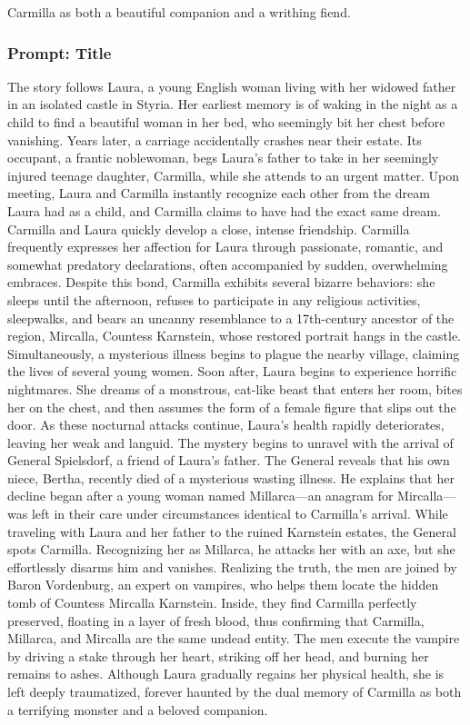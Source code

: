 \documentclass{article} %
\begin{document}
Carmilla as both a beautiful companion and a writhing fiend.

\subsubsection{Prompt: Title}

The story follows Laura, a young English woman living with her widowed father in an isolated castle in Styria. Her earliest memory is of waking in the night as a child to find a beautiful woman in her bed, who seemingly bit her chest before vanishing. Years later, a carriage accidentally crashes near their estate. Its occupant, a frantic noblewoman, begs Laura’s father to take in her seemingly injured teenage daughter, Carmilla, while she attends to an urgent matter. Upon meeting, Laura and Carmilla instantly recognize each other from the dream Laura had as a child, and Carmilla claims to have had the exact same dream. Carmilla and Laura quickly develop a close, intense friendship. Carmilla frequently expresses her affection for Laura through passionate, romantic, and somewhat predatory declarations, often accompanied by sudden, overwhelming embraces. Despite this bond, Carmilla exhibits several bizarre behaviors: she sleeps until the afternoon, refuses to participate in any religious activities, sleepwalks, and bears an uncanny resemblance to a 17th-century ancestor of the region, Mircalla, Countess Karnstein, whose restored portrait hangs in the castle. Simultaneously, a mysterious illness begins to plague the nearby village, claiming the lives of several young women. Soon after, Laura begins to experience horrific nightmares. She dreams of a monstrous, cat-like beast that enters her room, bites her on the chest, and then assumes the form of a female figure that slips out the door. As these nocturnal attacks continue, Laura’s health rapidly deteriorates, leaving her weak and languid. The mystery begins to unravel with the arrival of General Spielsdorf, a friend of Laura's father. The General reveals that his own niece, Bertha, recently died of a mysterious wasting illness. He explains that her decline began after a young woman named Millarca—an anagram for Mircalla—was left in their care under circumstances identical to Carmilla's arrival. While traveling with Laura and her father to the ruined Karnstein estates, the General spots Carmilla. Recognizing her as Millarca, he attacks her with an axe, but she effortlessly disarms him and vanishes. Realizing the truth, the men are joined by Baron Vordenburg, an expert on vampires, who helps them locate the hidden tomb of Countess Mircalla Karnstein. Inside, they find Carmilla perfectly preserved, floating in a layer of fresh blood, thus confirming that Carmilla, Millarca, and Mircalla are the same undead entity. The men execute the vampire by driving a stake through her heart, striking off her head, and burning her remains to ashes. Although Laura gradually regains her physical health, she is left deeply traumatized, forever haunted by the dual memory of Carmilla as both a terrifying monster and a beloved companion.
\end{document}
